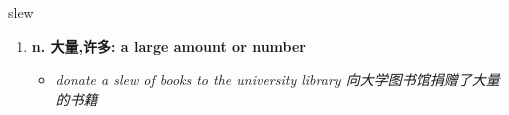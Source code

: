 
\begin{frame}
{\huge slew}
\begin{center}
\begin{enumerate}\Large
  \item \textbf{n. 大量,许多: a large amount or number}
  \begin{itemize}
    \item \em{\Large{donate a slew of books to the university library 向大学图书馆捐赠了大量的书籍}}
  \end{itemize}
\end{enumerate}
\end{center}
\end{frame}
